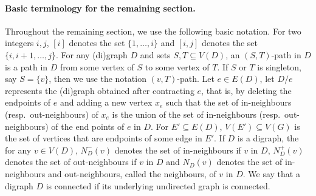 \paragraph*{Basic terminology for the remaining section.}Throughout the remaining section, we use the following basic notation. For two integers $i,j$, $[i]$ denotes the set $\{1, \ldots, i\}$ and $[i,j]$ denotes the set $\{i,i+1, \ldots,j\}$.  For any (di)graph $D$ and sets $S,T \subseteq V(D)$, an $(S,T)$-path in $D$ is a path in $D$ from some vertex of $S$ to some vertex of $T$. If $S$ or $T$ is singleton, say $S=\{v\}$, then we use the notation $(v,T)$-path. Let $e \in E(D)$, let $D/e$ represents the (di)graph obtained after contracting $e$, that is, by deleting the endpoints of $e$ and adding a new vertex $x_e$ such that the set of in-neighbours (resp.~out-neighbours) of $x_e$ is the union of the set of in-neighbours (resp.~out-neighbours) of the end points of $e$ in $D$. For $E' \subseteq E(D)$, $V(E') \subseteq V(G)$ is the set of vertices that are endpoints of some edge in $E'$. If $D$ is a digraph, the for any $v \in V(D)$, $N^-_D(v)$ denotes the set of in-neighbours if $v$ in $D$, $N^+_D(v)$ denotes the set of out-neighbours if $v$ in $D$ and $N_D(v)$ denotes the set of in-neighbours and out-neighbours, called the neighbours, of $v$ in $D$.
We say that a digraph $D$ is connected if its underlying undirected graph is connected. 